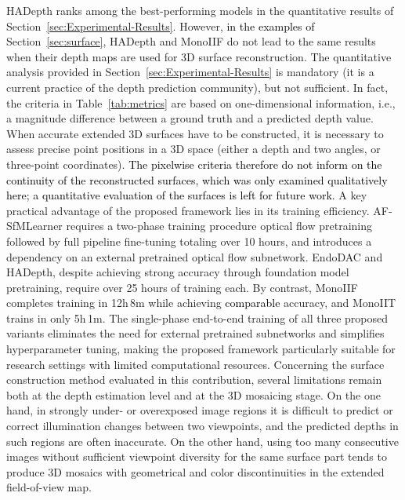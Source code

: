 \documentclass[a4paper,fleqn]{cas-dc}
\begin{document}
%
HADepth ranks among the best-performing models in the quantitative results of Section~\ref{sec:Experimental-Results}. However, \textcolor{black}{in the examples of} Section~\ref{sec:surface}, HADepth and MonoIIF do not lead to the same results when their depth maps are used for 3D surface reconstruction. The quantitative analysis provided in Section~\ref{sec:Experimental-Results} is mandatory (it is a current practice of the depth prediction community), but not sufficient. In fact, the criteria in Table~\ref{tab:metrics} are based on one-dimensional information, i.e., a magnitude difference between a ground truth and a predicted depth value. When accurate extended 3D surfaces have to be constructed, it is necessary to assess precise point positions in a 3D space (either a depth and two angles, or three-point coordinates). \textcolor{black}{The pixelwise criteria therefore do not inform on the continuity of the reconstructed surfaces, which was only examined qualitatively here; a quantitative evaluation of the surfaces is left for future work.}
%
A key practical advantage of the proposed framework lies in its training efficiency. AF-SfMLearner requires a two-phase training procedure optical flow pretraining followed by full pipeline fine-tuning totaling over 10 hours, and introduces a dependency on an external pretrained optical flow subnetwork. EndoDAC and HADepth, despite achieving strong accuracy through foundation model pretraining, require over 25 hours of training each. By contrast, MonoIIF completes training in 12h\,8m while achieving \textcolor{black}{comparable} accuracy, and MonoIIT trains in only 5h\,1m. The single-phase end-to-end training of all three proposed variants eliminates the need for external pretrained subnetworks and simplifies hyperparameter tuning, making the proposed framework particularly suitable for research settings with limited computational resources.
%
Concerning the surface construction method evaluated in this contribution, several limitations remain both at the depth estimation level and at the 3D mosaicing stage. On the one hand, in strongly under- or overexposed image regions it is difficult to predict or correct illumination changes between two viewpoints, and the predicted depths in such regions are often inaccurate. On the other hand, using too many consecutive images without sufficient viewpoint diversity for the same surface part tends to produce 3D mosaics with geometrical and color discontinuities in the extended field-of-view map.
%
\end{document}
